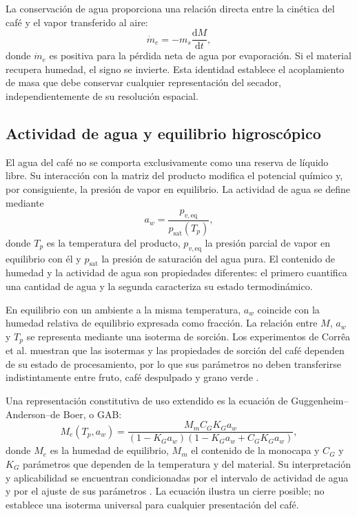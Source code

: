 La conservación de agua proporciona una relación directa entre la cinética del café y el vapor transferido al aire:
\begin{equation}
\dot m_e=-m_s\frac{\mathrm{d}M}{\mathrm{d}t},
\label{eq:evaporacion_producto}
\end{equation}
donde $\dot m_e$ es positiva para la pérdida neta de agua por evaporación. Si el material recupera humedad, el signo se invierte. Esta identidad establece el acoplamiento de masa que debe conservar cualquier representación del secador, independientemente de su resolución espacial.

\subsection{Actividad de agua y equilibrio higroscópico}
\label{subsec:equilibrio_higroscopico}

El agua del café no se comporta exclusivamente como una reserva de líquido libre. Su interacción con la matriz del producto modifica el potencial químico y, por consiguiente, la presión de vapor en equilibrio. La actividad de agua se define mediante
\begin{equation}
a_w=\frac{p_{v,\mathrm{eq}}}{p_{\mathrm{sat}}(T_p)},
\label{eq:actividad_agua}
\end{equation}
donde $T_p$ es la temperatura del producto, $p_{v,\mathrm{eq}}$ la presión parcial de vapor en equilibrio con él y $p_{\mathrm{sat}}$ la presión de saturación del agua pura. El contenido de humedad y la actividad de agua son propiedades diferentes: el primero cuantifica una cantidad de agua y la segunda caracteriza su estado termodinámico.

En equilibrio con un ambiente a la misma temperatura, $a_w$ coincide con la humedad relativa de equilibrio expresada como fracción. La relación entre $M$, $a_w$ y $T_p$ se representa mediante una isoterma de sorción. Los experimentos de Corrêa et al. muestran que las isotermas y las propiedades de sorción del café dependen de su estado de procesamiento, por lo que sus parámetros no deben transferirse indistintamente entre fruto, café despulpado y grano verde \cite{correa2010}.

Una representación constitutiva de uso extendido es la ecuación de Guggenheim--Anderson--de Boer, o GAB:
\begin{equation}
M_e(T_p,a_w)=
\frac{M_m C_G K_G a_w}
{(1-K_G a_w)(1-K_G a_w+C_G K_G a_w)},
\label{eq:gab}
\end{equation}
donde $M_e$ es la humedad de equilibrio, $M_m$ el contenido de la monocapa y $C_G$ y $K_G$ parámetros que dependen de la temperatura y del material. Su interpretación y aplicabilidad se encuentran condicionadas por el intervalo de actividad de agua y por el ajuste de sus parámetros \cite{timmermann2001}. La ecuación ilustra un cierre posible; no establece una isoterma universal para cualquier presentación del café.

